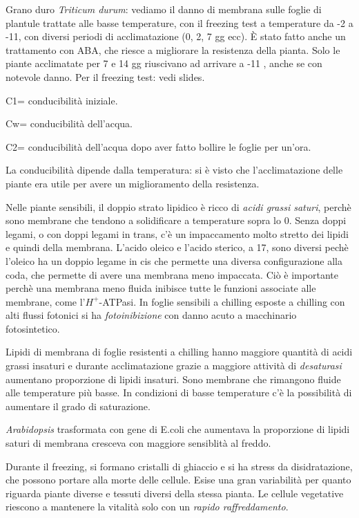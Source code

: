 \documentclass[a4paper,12pt]{book}
\begin{document}
Grano duro \emph{Triticum durum}: vediamo il danno di membrana sulle foglie di plantule trattate alle basse temperature, con il freezing test a temperature da -2 a -11, con diversi periodi di acclimatazione (0, 2, 7 gg ecc). È stato fatto anche un trattamento con ABA, che riesce a migliorare la resistenza della pianta. Solo le piante acclimatate per 7 e 14 gg riuscivano ad arrivare a -11 \textcelsius, anche se con notevole danno. Per il freezing test: vedi slides.

C1= conducibilità iniziale.

Cw= conducibilità dell'acqua.

C2= conducibilità dell'acqua dopo aver fatto bollire le foglie per un'ora.

La conducibilità dipende dalla temperatura: si è visto che l'acclimatazione delle piante era utile per avere un miglioramento della resistenza.

Nelle piante sensibili, il doppio strato lipidico è ricco di \emph{acidi grassi saturi}, perchè sono membrane che tendono a solidificare a temperature sopra lo 0. Senza doppi legami, o con doppi legami in trans, c'è un impaccamento molto stretto dei lipidi e quindi della membrana.  L'acido oleico e l'acido sterico, a 17\textcelsius, sono diversi pechè l'oleico ha un doppio legame in cis che permette una diversa configurazione alla coda, che permette di avere una membrana meno impaccata.
Ciò è importante perchè una membrana meno fluida inibisce tutte le funzioni associate alle membrane, come l'$H^+$-ATPasi.
In foglie sensibili a chilling esposte a chilling con alti flussi
fotonici si ha \emph{fotoinibizione} con danno acuto a macchinario fotosintetico.


Lipidi di membrana di foglie resistenti a chilling hanno maggiore
quantità di acidi grassi insaturi e durante acclimatazione grazie a maggiore attività di \emph{desaturasi}
aumentano proporzione di lipidi insaturi. Sono membrane che rimangono fluide alle temperature più basse. In condizioni di basse temperature c'è la possibilità di aumentare il grado di saturazione.

\emph{Arabidopsis} trasformata con gene di E.coli che aumentava la proporzione di lipidi saturi di membrana cresceva con maggiore sensiblità al freddo.

Durante il freezing, si formano cristalli di ghiaccio e si ha stress da disidratazione, che possono portare alla morte delle cellule. Esise una gran variabilità per quanto riguarda piante diverse e tessuti diversi della stessa pianta. Le cellule vegetative riescono a mantenere la vitalità solo con un \emph{rapido raffreddamento}.
\end{document}
